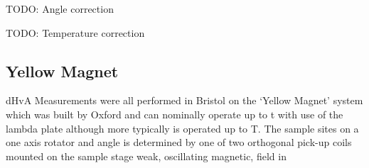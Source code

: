 TODO: Angle correction

TODO: Temperature correction

\subsection{Yellow Magnet}

dHvA Measurements were all performed in Bristol on the `Yellow Magnet' system which was built by Oxford and can nominally operate up to \unit[20]{t} with use of the lambda plate although more typically is operated up to \unit[18]{T}. The sample sites on a one axis rotator and angle is determined by one of two orthogonal pick-up coils mounted on the sample stage weak, oscillating magnetic, field in

